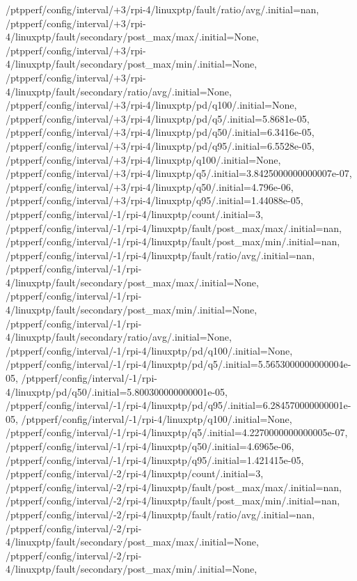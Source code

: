 {    /ptpperf/config/interval/+3/rpi-4/linuxptp/fault/ratio/avg/.initial=nan,
    /ptpperf/config/interval/+3/rpi-4/linuxptp/fault/secondary/post_max/max/.initial=None,
    /ptpperf/config/interval/+3/rpi-4/linuxptp/fault/secondary/post_max/min/.initial=None,
    /ptpperf/config/interval/+3/rpi-4/linuxptp/fault/secondary/ratio/avg/.initial=None,
    /ptpperf/config/interval/+3/rpi-4/linuxptp/pd/q100/.initial=None,
    /ptpperf/config/interval/+3/rpi-4/linuxptp/pd/q5/.initial=5.8681e-05,
    /ptpperf/config/interval/+3/rpi-4/linuxptp/pd/q50/.initial=6.3416e-05,
    /ptpperf/config/interval/+3/rpi-4/linuxptp/pd/q95/.initial=6.5528e-05,
    /ptpperf/config/interval/+3/rpi-4/linuxptp/q100/.initial=None,
    /ptpperf/config/interval/+3/rpi-4/linuxptp/q5/.initial=3.8425000000000007e-07,
    /ptpperf/config/interval/+3/rpi-4/linuxptp/q50/.initial=4.796e-06,
    /ptpperf/config/interval/+3/rpi-4/linuxptp/q95/.initial=1.44088e-05,
    /ptpperf/config/interval/-1/rpi-4/linuxptp/count/.initial=3,
    /ptpperf/config/interval/-1/rpi-4/linuxptp/fault/post_max/max/.initial=nan,
    /ptpperf/config/interval/-1/rpi-4/linuxptp/fault/post_max/min/.initial=nan,
    /ptpperf/config/interval/-1/rpi-4/linuxptp/fault/ratio/avg/.initial=nan,
    /ptpperf/config/interval/-1/rpi-4/linuxptp/fault/secondary/post_max/max/.initial=None,
    /ptpperf/config/interval/-1/rpi-4/linuxptp/fault/secondary/post_max/min/.initial=None,
    /ptpperf/config/interval/-1/rpi-4/linuxptp/fault/secondary/ratio/avg/.initial=None,
    /ptpperf/config/interval/-1/rpi-4/linuxptp/pd/q100/.initial=None,
    /ptpperf/config/interval/-1/rpi-4/linuxptp/pd/q5/.initial=5.5653000000000004e-05,
    /ptpperf/config/interval/-1/rpi-4/linuxptp/pd/q50/.initial=5.800300000000001e-05,
    /ptpperf/config/interval/-1/rpi-4/linuxptp/pd/q95/.initial=6.284570000000001e-05,
    /ptpperf/config/interval/-1/rpi-4/linuxptp/q100/.initial=None,
    /ptpperf/config/interval/-1/rpi-4/linuxptp/q5/.initial=4.2270000000000005e-07,
    /ptpperf/config/interval/-1/rpi-4/linuxptp/q50/.initial=4.6965e-06,
    /ptpperf/config/interval/-1/rpi-4/linuxptp/q95/.initial=1.421415e-05,
    /ptpperf/config/interval/-2/rpi-4/linuxptp/count/.initial=3,
    /ptpperf/config/interval/-2/rpi-4/linuxptp/fault/post_max/max/.initial=nan,
    /ptpperf/config/interval/-2/rpi-4/linuxptp/fault/post_max/min/.initial=nan,
    /ptpperf/config/interval/-2/rpi-4/linuxptp/fault/ratio/avg/.initial=nan,
    /ptpperf/config/interval/-2/rpi-4/linuxptp/fault/secondary/post_max/max/.initial=None,
    /ptpperf/config/interval/-2/rpi-4/linuxptp/fault/secondary/post_max/min/.initial=None,
}
